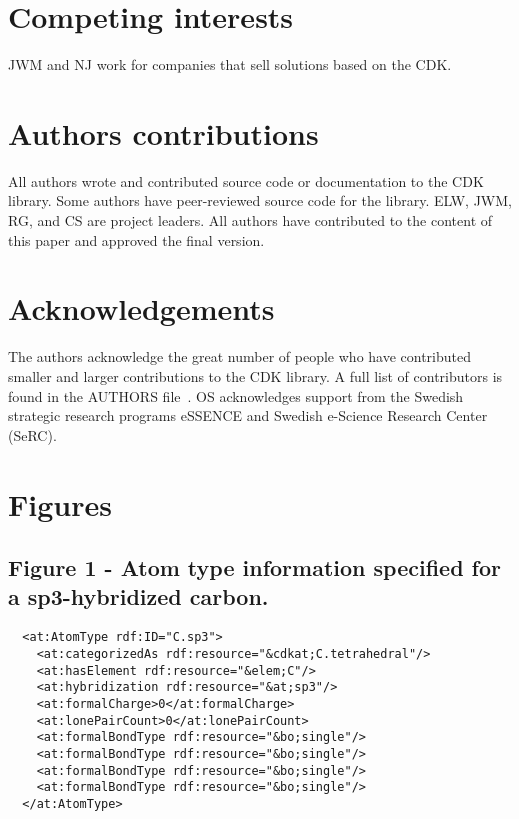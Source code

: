 \documentclass[10pt]{bmcart}
\begin{document}
\begin{backmatter}

\section*{Competing interests}
JWM and NJ work for companies that sell solutions based on the CDK.

\section*{Authors contributions}
All authors wrote and contributed source code or documentation to the CDK
library. Some authors have peer-reviewed source code for the library.
ELW, JWM, RG, and CS are project leaders. All authors have contributed to the
content of this paper and approved the final version.

\section*{Acknowledgements}
The authors acknowledge the great number of people who have contributed smaller
and larger contributions to the CDK library. A full list of contributors is
found in the AUTHORS file~\cite{AUTHORS}. OS acknowledges support from the Swedish strategic research programs eSSENCE and Swedish e-Science Research Center (SeRC).




\newpage

\section*{Figures}

\subsection*{Figure 1 - Atom type information specified for a sp3-hybridized
carbon.}\label{fig:atomtype}
\begin{verbatim}
  <at:AtomType rdf:ID="C.sp3">
    <at:categorizedAs rdf:resource="&cdkat;C.tetrahedral"/>
    <at:hasElement rdf:resource="&elem;C"/>
    <at:hybridization rdf:resource="&at;sp3"/>
    <at:formalCharge>0</at:formalCharge>
    <at:lonePairCount>0</at:lonePairCount>
    <at:formalBondType rdf:resource="&bo;single"/>
    <at:formalBondType rdf:resource="&bo;single"/>
    <at:formalBondType rdf:resource="&bo;single"/>
    <at:formalBondType rdf:resource="&bo;single"/>
  </at:AtomType>
\end{verbatim}


\end{backmatter}
\end{document}
